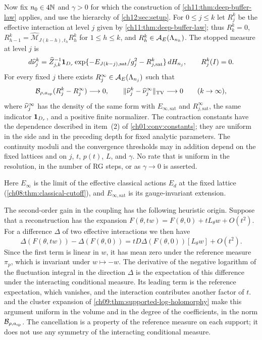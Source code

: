 \begin{theorem}
Now fix $n_0\in4\mathbb N$ and $\gamma>0$ for which the construction of \cref{ch11:thm:deep-buffer-law} applies, and use the hierarchy of \cref{ch12:sec:setup}. For $0\le j\le k$ let $R_j^k$ be the effective interaction at level $j$ given by \cref{ch11:thm:deep-buffer-law}; thus $R_k^k=0$, $R_{h-1}^k=\widehat{\mathcal M}_{J(k-h),t_h}R_h^k$ for $1\le h\le k$, and $R_h^k\in\mathcal A_E(\Lambda_{n_h})$. The stopped measure at level $j$ is
\[
 d\widehat\nu_j^k=\widehat Z_{j,k}^{-1}\mathbf 1_{D_r}\exp\{-E_{J(k-j),\mathrm{sat}}/g_j^2-R_{j,\mathrm{sat}}^k\}\,dH_{n_j},\qquad R_j^k(I)=0 .
\]
For every fixed $j$ there exists $R_j^\infty\in\mathcal A_E(\Lambda_{n_j})$ such that
\[
 \mathcal B_{\rho,a_{\mathrm{sp}}}(R_j^k-R_j^\infty)\longrightarrow0,\qquad
 \lVert \widehat\nu_j^k-\widehat\nu_j^\infty\rVert_{\operatorname{TV}}\longrightarrow0\qquad(k\to\infty),
\]
where $\widehat\nu_j^\infty$ has the density of the same form with $E_{\infty,\mathrm{sat}}$ and $R_{j,\mathrm{sat}}^\infty$, the same indicator $\mathbf 1_{D_r}$, and a positive finite normalizer. The contraction constants have the dependence described in item~(2) of \cref{ch01:conv:constants}; they are uniform in the side and in the preceding depth for fixed analytic parameters. The continuity moduli and the convergence thresholds may in addition depend on the fixed lattices and on $j$, $t$, $p(t)$, $L$, and $\gamma$. No rate that is uniform in the resolution, in the number of RG steps, or as $\gamma\to0$ is asserted.
\end{theorem}

Here $E_\infty$ is the limit of the effective classical actions $E_d$ at the fixed lattice (\cref{ch08:thm:classical-cutoff}), and $E_{\infty,\mathrm{sat}}$ is its gauge-invariant extension.

\begin{remark}
The second-order gain in the coupling has the following heuristic origin. Suppose that a reconstruction has the expansion $F(\theta,tw)=F(\theta,0)+tL_\theta w+O(t^2)$. For a difference $\Delta$ of two effective interactions we then have
\[
 \Delta(F(\theta,tw))-\Delta(F(\theta,0))=tD\Delta(F(\theta,0))[L_\theta w]+O(t^2).
\]
Since the first term is linear in $w$, it has mean zero under the reference measure $\pi_p$, which is invariant under $w\mapsto-w$. The derivative of the negative logarithm of the fluctuation integral in the direction $\Delta$ is the expectation of this difference under the interacting conditional measure. Its leading term is the reference expectation, which vanishes, and the interaction contributes another factor of $t$.  and the cluster expansion of \cref{ch09:thm:supported-log-holomorphy} make this argument uniform in the volume and in the degree of the coefficients, in the norm $\mathcal B_{\rho,a_{\mathrm{sp}}}$. The cancellation is a property of the reference measure on each support; it does not use any symmetry of the interacting conditional measure.
\end{remark}

